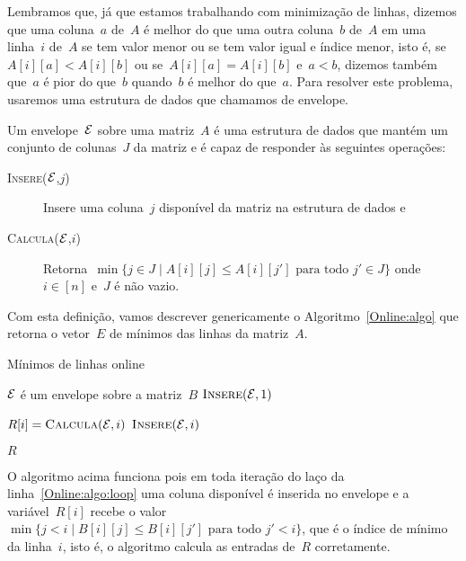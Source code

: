 Lembramos que, já que estamos trabalhando com minimização de linhas, dizemos que uma coluna~$a$ de~$A$ é melhor do que uma outra coluna~$b$ de~$A$ em uma linha~$i$ de~$A$ se tem valor menor ou se tem valor igual e índice menor, isto é, se~$A[i][a] < A[i][b]$ ou se~$A[i][a] = A[i][b]$ e~$a < b$, dizemos também que~$a$ é pior do que~$b$ quando~$b$ é melhor do que~$a$. Para resolver este problema, usaremos uma estrutura de dados que chamamos de envelope.

\begin{defi}
Um envelope~$\mathcal{E}$ sobre uma matriz~$A$ é uma estrutura de dados que mantém um conjunto de colunas~$J$ da matriz e é capaz de responder às seguintes operações:

\begin{description}
    \item[\textsc{Insere}($\mathcal{E}$,$j$)] Insere uma coluna~$j$ disponível da matriz na estrutura de dados e
    \item[\textsc{Calcula}($\mathcal{E}$,$i$)] Retorna~$\min\{j \in J \mid A[i][j] \leq A[i][j'] \text{ para todo } j' \in J\}$ onde~$i \in [n]$ e~$J$ é não vazio.
\end{description}
\end{defi}

Com esta definição, vamos descrever genericamente o Algoritmo~\ref{Online:algo} que retorna o vetor~$E$ de mínimos das linhas da matriz~$A$.

\begin{algorithm}[h]
\caption{Mínimos de linhas online}
\label{Online:algo}
\begin{algorithmic}[1]
    \State $\mathcal{E}$ é um envelope sobre a matriz~$B$
    \State $\textsc{Insere}(\mathcal{E},1)$

     \label{Online:algo:loop}
        \State $R[i] = \textsc{Calcula}(\mathcal{E},i)$
        \State $\textsc{Insere}(\mathcal{E},i)$
    \EndFor

    \State \Return $R$
\EndFunction
\end{algorithmic}
\end{algorithm}

O algoritmo acima funciona pois em toda iteração do laço da linha~\ref{Online:algo:loop} uma coluna disponível é inserida no envelope e a variável~$R[i]$ recebe o valor~$\min\{ j < i \mid B[i][j] \leq B[i][j'] \text{ para todo } j' < i\}$, que é o índice de mínimo da linha~$i$, isto é, o algoritmo calcula as entradas de~$R$ corretamente.

